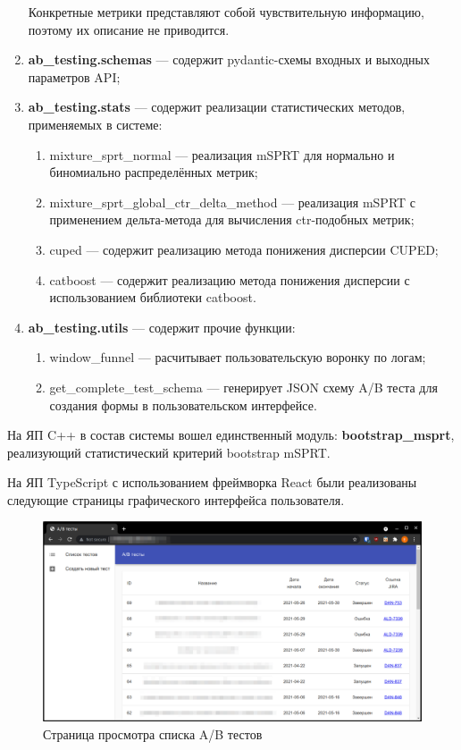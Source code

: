 \documentclass[../document.tex]{subfiles}
\begin{document}
\begin{enumerate}
\begin{enumerate}
		\end{enumerate}
		\par Конкретные метрики представляют собой чувствительную информацию, поэтому их описание не приводится.
		\item \textbf{ab\_testing.schemas} --- содержит pydantic-схемы входных и выходных параметров API;
		\item \textbf{ab\_testing.stats} --- содержит реализации статистических методов, применяемых в системе:
		\begin{enumerate}
			\item mixture\_sprt\_normal --- реализация mSPRT для нормально и биномиально распределённых метрик;
			\item mixture\_sprt\_global\_ctr\_delta\_method --- реализация mSPRT с применением дельта-метода для вычисления \gls{ctr}-подобных метрик;
			\item cuped --- содержит реализацию метода понижения дисперсии CUPED;
			\item catboost --- содержит реализацию метода понижения дисперсии с использованием библиотеки catboost.
		\end{enumerate}
		\item \textbf{ab\_testing.utils} --- содержит прочие функции:
		\begin{enumerate}
			\item window\_funnel --- расчитывает пользовательскую воронку по логам;
			\item get\_complete\_test\_schema --- генерирует JSON схему A/B теста для создания формы в пользовательском интерфейсе.
		\end{enumerate}
	\end{enumerate}
	\par На ЯП C++ в состав системы вошел единственный модуль: \textbf{bootstrap\_msprt}, реализующий статистический критерий bootstrap mSPRT.
	\par На ЯП TypeScript с использованием фреймворка React были реализованы следующие страницы графического интерфейса пользователя.
	\begin{figure}[h]
		\centering
		\includegraphics[width=\linewidth]{main_page.png}
		\caption{\label{image:ab_list}Страница просмотра списка A/B тестов}
	\end{figure}
\end{document}

